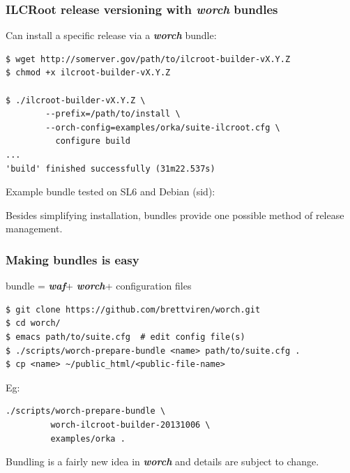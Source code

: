 \documentclass[xcolor=dvipsnames]{beamer}
\newcommand{\app}[1]{\textbf{\textit{#1}}\xspace}
\def\waf{\app{waf}}
\def\worch{\app{worch}}
\begin{document}
\begin{frame}[fragile]
  \frametitle{ILCRoot release versioning with \worch{} bundles}

  Can install a specific release via a \worch bundle:

{\scriptsize
\begin{verbatim}
$ wget http://somerver.gov/path/to/ilcroot-builder-vX.Y.Z
$ chmod +x ilcroot-builder-vX.Y.Z

$ ./ilcroot-builder-vX.Y.Z \
        --prefix=/path/to/install \
        --orch-config=examples/orka/suite-ilcroot.cfg \
          configure build
...
'build' finished successfully (31m22.537s)
\end{verbatim}
}

Example bundle tested on SL6 and Debian (sid):

Besides simplifying installation, bundles provide one possible method of release management.

\end{frame}

\begin{frame}[fragile]
  \frametitle{Making bundles is easy}

  \begin{center}
    bundle = \waf + \worch + configuration files    
  \end{center}

{
  \small
\begin{verbatim}
$ git clone https://github.com/brettviren/worch.git
$ cd worch/
$ emacs path/to/suite.cfg  # edit config file(s)
$ ./scripts/worch-prepare-bundle <name> path/to/suite.cfg .
$ cp <name> ~/public_html/<public-file-name>
\end{verbatim}
}

Eg:

\begin{verbatim}
./scripts/worch-prepare-bundle \
         worch-ilcroot-builder-20131006 \
         examples/orka .
\end{verbatim}

Bundling is a fairly new idea in \worch and details are subject to change.

\end{frame}
\end{document}
